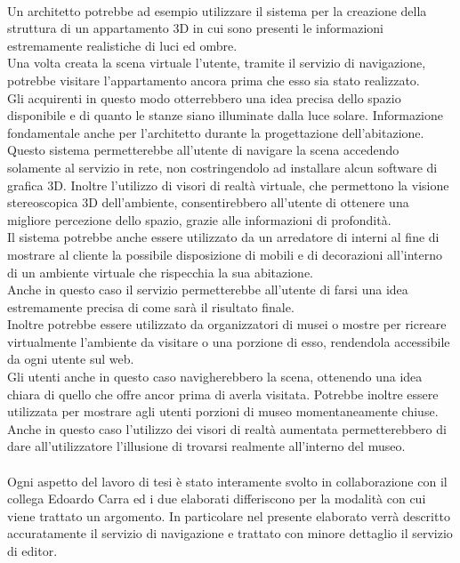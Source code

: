 \\
Un architetto potrebbe ad esempio utilizzare il sistema per la creazione della struttura di un appartamento 3D in cui sono presenti le informazioni estremamente realistiche di luci ed ombre.
\\
Una volta creata la scena virtuale l’utente, tramite il servizio di navigazione, potrebbe visitare l’appartamento ancora prima che esso sia stato realizzato.
\\ 
Gli acquirenti in questo modo otterrebbero una idea precisa dello spazio disponibile e di quanto le stanze siano illuminate dalla luce solare. Informazione fondamentale anche per l’architetto durante la progettazione dell’abitazione.
\\
Questo sistema permetterebbe all’utente di navigare la scena accedendo solamente al servizio in rete, non costringendolo ad installare alcun software di grafica 3D.
Inoltre l’utilizzo di visori di realtà virtuale, che permettono la visione stereoscopica 3D dell’ambiente, consentirebbero all’utente di ottenere una migliore percezione dello spazio, grazie alle informazioni di profondità.
\\
Il sistema potrebbe anche essere utilizzato da un arredatore di interni al fine di mostrare al cliente la possibile disposizione di mobili e di decorazioni all’interno di un ambiente virtuale che rispecchia la sua abitazione. 
\\
Anche in questo caso il servizio permetterebbe all’utente di farsi una idea estremamente precisa di come sarà il risultato finale.
\\
Inoltre potrebbe essere utilizzato da organizzatori di musei o mostre per ricreare virtualmente  l’ambiente da visitare o una porzione di esso, rendendola accessibile da ogni utente sul web. 
\\
Gli utenti anche in questo caso navigherebbero la scena, ottenendo una idea chiara di quello che offre ancor prima di averla visitata. Potrebbe inoltre essere utilizzata per mostrare agli utenti porzioni di museo momentaneamente chiuse.
\\
Anche in questo caso l’utilizzo dei visori di realtà aumentata permetterebbero di dare all’utilizzatore l’illusione di trovarsi realmente all’interno del museo.
\\
\\
Ogni aspetto del lavoro di tesi è stato interamente svolto in collaborazione con il collega Edoardo Carra ed i due elaborati differiscono per la modalità con cui viene trattato un argomento.
In particolare nel presente elaborato verrà descritto accuratamente il servizio di navigazione e trattato con minore dettaglio il servizio di editor.
